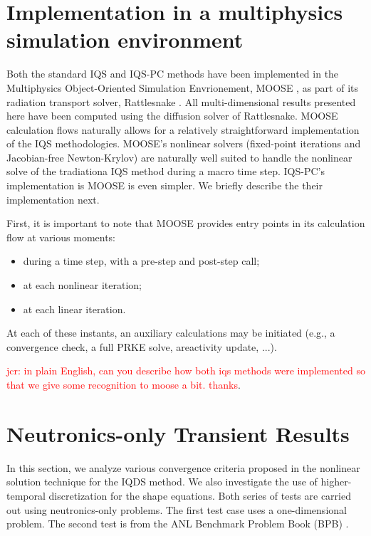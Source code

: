 \documentclass{elsarticle}
\newcommand{\iqspc}{IQS-PC\xspace}
\newcommand{\jcr}[1]{\textcolor{red}{jcr: #1}}
\begin{document}
\section{Implementation in a multiphysics simulation environment}

Both the standard IQS and \iqspc methods have been implemented in the Multiphysics Object-Oriented
Simulation Envrionement, MOOSE \cite{}, as part of its radiation transport solver, Rattlesnake \cite{}.
All multi-dimensional results presented here have been computed using the diffusion solver of Rattlesnake.
MOOSE calculation flows naturally allows for a relatively straightforward implementation of the IQS methodologies.
MOOSE's nonlinear solvers (fixed-point iterations and Jacobian-free Newton-Krylov) are naturally well
suited to handle the nonlinear solve of the tradiationa IQS method during a macro time step. \iqspc's implementation
is MOOSE is even simpler. We briefly describe the their implementation next. 

First, it is important to note that MOOSE provides entry points in its calculation flow at various moments:
\begin{itemize}
\item during a time step, with a pre-step and post-step call;
\item at each nonlinear iteration;
\item at each linear iteration.
\end{itemize}
At each of these instants, an auxiliary calculations may be initiated (e.g., a convergence check, a full PRKE
solve, areactivity update, ...).  

\jcr{in plain English, can you describe how both iqs methods were implemented so that we give some recognition
to moose a bit. thanks}.

\section{Neutronics-only Transient Results}

In this section, we analyze various convergence criteria proposed in the nonlinear solution technique for the IQDS method.
We also investigate the use of higher-temporal discretization for the shape equations.
Both series of tests are carried out using neutronics-only problems.  The first test case uses a one-dimensional problem.  
The second test is from the ANL Benchmark Problem Book (BPB) \cite{ANL_BPB}.
\end{document}
